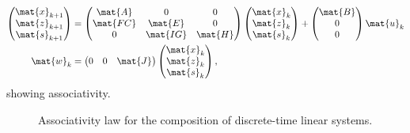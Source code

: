 \begin{equation*}
    \label{eq:dlin-7}
    \begin{aligned}
        \begin{pmatrix}
            \mat{x}_{k+1}\\
            \mat{z}_{k+1}\\
            \mat{s}_{k+1}
        \end{pmatrix}&=
        \begin{pmatrix}
            \mat{A}&0&0\\
            \mat{FC}&\mat{E}&0\\
            0&\mat{IG}&\mat{H}
        \end{pmatrix}\begin{pmatrix}
                         \mat{x}_k\\ \mat{z}_k\\ \mat{s}_k
        \end{pmatrix}+
        \begin{pmatrix}
            \mat{B}\\ 0\\ 0
        \end{pmatrix}\mat{u}_k\\
        \mat{w}_k&=\begin{pmatrix}
                       0&0&\mat{J}
        \end{pmatrix}\begin{pmatrix}
                         \mat{x}_k\\ \mat{z}_k\\ \mat{s}_k
        \end{pmatrix},
    \end{aligned}
\end{equation*}
showing associativity.

\begin{figure}[tbh]
    \centering
    \begin{center}
        {
        }
    \end{center}
    \caption{Associativity law for the composition of discrete-time linear systems. \label{fig:ass_dyn_syst}}
\end{figure}

